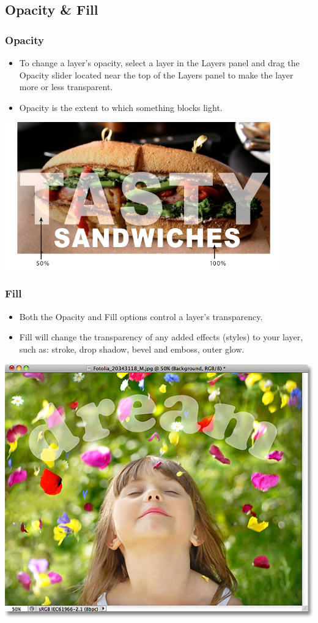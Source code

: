 \documentclass{beamer}
\begin{document}
		\subsection{Opacity \& Fill}		
\begin{frame}
	\frametitle{Opacity}
	\begin{itemize}
		\item To change a layer’s opacity, select a layer in the Layers panel and drag the Opacity slider located near the top of the Layers panel to make the layer more or less transparent.
		\item Opacity is the extent to which something blocks light.
	\end{itemize}
	\begin{center}
		\includegraphics[width = 0.9\textwidth]{images/opacity.png}
	\end{center}
\end{frame}

\begin{frame}
	\frametitle{Fill}
	\begin{itemize}
		\item Both the Opacity and Fill options control a layer's transparency.
		\item Fill will change the transparency of any added effects (styles) to your layer, such as: stroke, drop shadow, bevel and emboss, outer glow.
	\end{itemize}
	\begin{center}
		\includegraphics[width = 1.0\textwidth]{images/fill.png}
	\end{center}
\end{frame}
\end{document}
